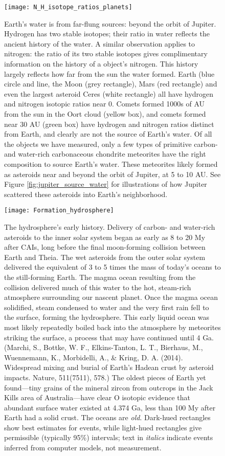 {\newpage
\begin{figure}[p]
\centering
  \texttt{[image: N\_H\_isotope\_ratios\_planets]}%
\caption{Earth's water is from far-flung sources: beyond the orbit of Jupiter. Hydrogen has two stable isotopes; their ratio in water reflects the ancient history of the water. A similar observation applies to nitrogen: the ratio of its two stable isotopes gives complimentary information on the history of a object's nitrogen. This history largely reflects how far from the sun the water formed. Earth (blue circle and line, the Moon (grey rectangle), Mars (red rectangle) and even the largest asteroid Ceres (white rectangle) all have hydrogen and nitrogen isotopic ratios near 0. Comets formed 1000s of AU from the sun in the Oort cloud (yellow box), and comets formed near 30 AU (green box) have hydrogen and nitrogen ratios distinct from Earth, and clearly are not the source of Earth's water. Of all the objects we have measured, only a few types of primitive carbon- and water-rich carbonaceous chondrite meteorites have the right composition to source Earth's water. These meteorites likely formed as asteroids near and beyond the orbit of Jupiter, at 5 to 10 AU. See Figure \ref{fig:jupiter_source_water} for illustrations of how Jupiter scattered these asteroids into Earth's neighborhood.} 
\label{fig:N_h_isotopes}
\end{figure}

\newpage
\begin{figure}
\centering
\texttt{[image: Formation\_hydrosphere]}%
\caption{The hydrosphere's early history. Delivery of carbon- and water-rich asteroids to the inner solar system began as early as 8 to 20 My after CAIs, long before the final moon-forming collision between Earth and Theia. The wet asteroids from the outer solar system delivered the equivalent of 3 to 5 times the mass of today's oceans to the still-forming Earth. The magma ocean resulting from the collision delivered much of this water to the hot, steam-rich atmosphere surrounding our nascent planet. Once the magma ocean solidified, steam condensed to water and the very first rain fell to the surface, forming the hydrosphere. This early liquid ocean was most likely repeatedly boiled back into the atmosphere by meteorites striking the surface, a process that may have continued until 4 Ga.(Marchi, S., Bottke, W. F., Elkins-Tanton, L. T., Bierhaus, M., Wuennemann, K., Morbidelli, A., \& Kring, D. A. (2014). Widespread mixing and burial of Earth's Hadean crust by asteroid impacts. Nature, 511(7511), 578.) The oldest pieces of Earth yet found---tiny grains of the mineral zircon from outcrops in the Jack Kills area of Australia---have clear O isotopic evidence that abundant surface water existed at 4.374 Ga, less than 100 My after Earth had a solid crust. The oceans are \emph{old}. Dark-hued rectangles show best estimates for events, while light-hued rectangles give permissible (typically 95\%) intervals; text in \textit{italics} indicate events inferred from computer models, not measurement.}   
\label{fig:water_timing}
\end{figure}


}

